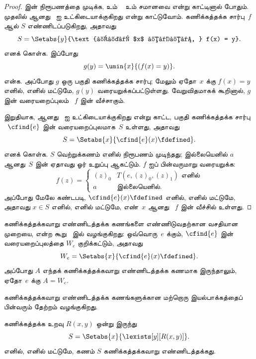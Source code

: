 \documentclass[../../../include/open-logic-section]{subfiles}
\begin{document}
\begin{proof}
 இன் நிரூபணத்தை முடிக்க,  உம்
~ உம் சமானவை என்று காட்டினால் போதும். முதலில்
 ஆனது~ ஐ உட்கிடையாக்குகிறது
என்று காட்டுவோம். கணிக்கத்தக்க சார்பு~$f$ ஆல் $S$ எண்ணிடப்படுகிறது,
அதாவது
\[
S = \Setabs{y}{\text{ஏதோ $x$ க்கு, } f(x) = y}.
\]
எனக் கொள்க. இப்போது
\[
g(y) = \umin{x}{(f(x) = y)}.
\]
என்க. அப்போது $g$ ஒரு பகுதி கணிக்கத்தக்க சார்பு; மேலும்
ஏதோ~$x$ க்கு $f(x) = y$ எனில், எனில் மட்டுமே, $g(y)$
வரையறுக்கப்பட்டுள்ளது. வேறுவிதமாகக் கூறினால், $g$ இன் வரையறைப்புலம்
~$f$ இன் வீச்சாகும். 

இறுதியாக,  ஆனது~ ஐ
உட்கிடையாக்குகிறது என்று காட்ட, பகுதி கணிக்கத்தக்க சார்பு
~$\cfind{e}$ இன் வரையறைப்புலமாக~$S$ உள்ளது, அதாவது
\[
S = \Setabs{x}{\cfind{e}(x) \fdefined}.
\]
எனக் கொள்க. $S$ வெற்றுக்கணம் எனில் நிரூபணம் முடிந்தது;
இல்லையெனில் $a$ ஆனது~$S$ இன் ஏதாவது ஓர் உறுப்பு ஆகட்டும்.
$f$ ஐப் பின்வருமாறு வரையறுக்க:
\[
f(z) = \begin{cases}
(z)_0 & \text{$T(e,(z)_0,(z)_1)$ எனில்} \\
a & \text{இல்லையெனில்.}
\end{cases}
\]
அப்போது மேலே கண்டபடி, $\cfind{e}(x) \fdefined$ எனில், எனில்
மட்டுமே, அதாவது $x \in S$ எனில், எனில் மட்டுமே, எண்~$x$ ஆனது
~$f$ இன் வீச்சில் உள்ளது. 
\end{proof}

கணிக்கத்தக்கவாறு எண்ணிடத்தக்க கணங்களை எண்ணிடுவதற்கான வசதியான
முறையை,  என்ற கூறு~ இல்
வழங்குகிறது:
ஒவ்வொரு~$e$ க்கும், $\cfind{e}$ இன் வரையறைப்புலத்தை $W_e$ குறிக்கட்டும்,
அதாவது
\[
W_e = \Setabs{x}{\cfind{e}(x) \fdefined}.
\]
அப்போது $A$ எந்தக் கணிக்கத்தக்கவாறு எண்ணிடத்தக்க கணமாக இருந்தாலும்,
ஏதோ~$e$ க்கு $A = W_e$.

கணிக்கத்தக்கவாறு எண்ணிடத்தக்க கணங்களுக்கான மற்றொரு இயல்பாக்கத்தைப்
பின்வரும் தேற்றம் வழங்குகிறது.

\begin{thm}
கணிக்கத்தக்க உறவு $R(x,y)$ ஒன்று இருந்து
\[
S = \Setabs{ x }{ \lexists[y][R(x,y)] }.
\]
எனில், எனில் மட்டுமே, கணம் $S$ கணிக்கத்தக்கவாறு எண்ணிடத்தக்கது.
\end{thm}
\end{document}
